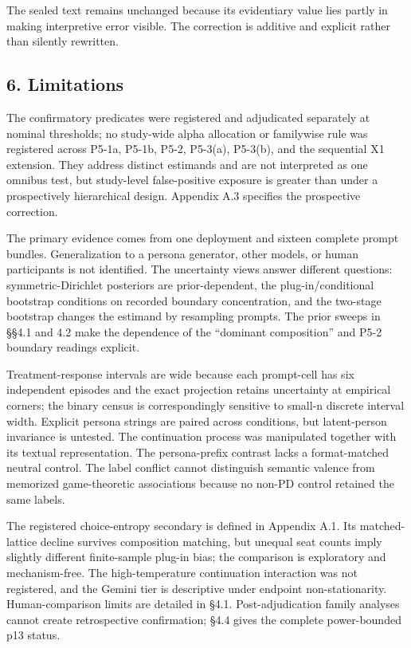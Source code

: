 \documentclass[
  11pt]{article}
\begin{document}
The sealed text remains unchanged because its evidentiary value lies
partly in making interpretive error visible. The correction is additive
and explicit rather than silently rewritten.

\subsection{6. Limitations}\label{limitations}

The confirmatory predicates were registered and adjudicated separately
at nominal thresholds; no study-wide alpha allocation or familywise rule
was registered across P5-1a, P5-1b, P5-2, P5-3(a), P5-3(b), and the
sequential X1 extension. They address distinct estimands and are not
interpreted as one omnibus test, but study-level false-positive exposure
is greater than under a prospectively hierarchical design. Appendix A.3
specifies the prospective correction.

The primary evidence comes from one deployment and sixteen complete
prompt bundles. Generalization to a persona generator, other models, or
human participants is not identified. The uncertainty views answer
different questions: symmetric-Dirichlet posteriors are prior-dependent,
the plug-in/conditional bootstrap conditions on recorded boundary
concentration, and the two-stage bootstrap changes the estimand by
resampling prompts. The prior sweeps in §§4.1 and 4.2 make the dependence
of the ``dominant composition'' and P5-2 boundary readings explicit.

Treatment-response intervals are wide because each prompt-cell has six
independent episodes and the exact projection retains uncertainty at
empirical corners; the binary census is correspondingly sensitive to
small-n discrete interval width. Explicit persona strings are paired
across conditions, but latent-person invariance is untested. The
continuation process was manipulated together with its textual
representation. The persona-prefix contrast lacks a format-matched
neutral control. The label conflict cannot distinguish semantic valence
from memorized game-theoretic associations because no non-PD control
retained the same labels.

The registered choice-entropy secondary is defined in Appendix A.1. Its
matched-lattice decline survives composition matching, but unequal seat
counts imply slightly different finite-sample plug-in bias; the
comparison is exploratory and mechanism-free. The high-temperature
continuation interaction was not registered, and the Gemini tier is
descriptive under endpoint non-stationarity. Human-comparison limits are
detailed in §4.1. Post-adjudication family analyses cannot create
retrospective confirmation; §4.4 gives the complete power-bounded p13
status.
\end{document}
